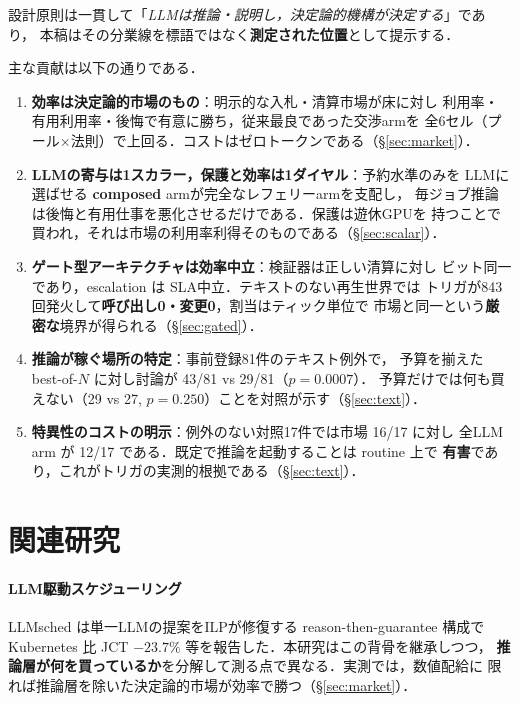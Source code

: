 \documentclass[uplatex,twocolumn,fontsize=9pt,paper=a4]{jlreq}
\begin{document}
設計原則は一貫して「\textit{LLMは推論・説明し，決定論的機構が決定する}」であり，
本稿はその分業線を標語ではなく\textbf{測定された位置}として提示する．

主な貢献は以下の通りである．
\begin{enumerate}
  \item \textbf{効率は決定論的市場のもの}：明示的な入札・清算市場が床に対し
        利用率・有用利用率・後悔で有意に勝ち，従来最良であった交渉armを
        全6セル（プール$\times$法則）で上回る．コストはゼロトークンである（\S\ref{sec:market}）．
  \item \textbf{LLMの寄与は1スカラー，保護と効率は1ダイヤル}：予約水準のみを
        LLMに選ばせる \textbf{composed} armが完全なレフェリーarmを支配し，
        毎ジョブ推論は後悔と有用仕事を悪化させるだけである．保護は遊休GPUを
        持つことで買われ，それは市場の利用率利得そのものである（\S\ref{sec:scalar}）．
  \item \textbf{ゲート型アーキテクチャは効率中立}：検証器は正しい清算に対し
        ビット同一であり，escalation は SLA中立．テキストのない再生世界では
        トリガが843回発火して\textbf{呼び出し0・変更0}，割当はティック単位で
        市場と同一という\textbf{厳密な}境界が得られる（\S\ref{sec:gated}）．
  \item \textbf{推論が稼ぐ場所の特定}：事前登録81件のテキスト例外で，
        予算を揃えた best-of-$N$ に対し討論が 43/81 vs 29/81（$p=0.0007$）．
        予算だけでは何も買えない（29 vs 27, $p=0.250$）ことを対照が示す（\S\ref{sec:text}）．
  \item \textbf{特異性のコストの明示}：例外のない対照17件では市場 16/17 に対し
        全LLM arm が 12/17 である．既定で推論を起動することは routine 上で
        \textbf{有害}であり，これがトリガの実測的根拠である（\S\ref{sec:text}）．
\end{enumerate}

\section{関連研究}
\paragraph{LLM駆動スケジューリング}
LLMsched \cite{llmsched} は単一LLMの提案をILPが修復する reason-then-guarantee 構成で
Kubernetes 比 JCT $-23.7\%$ 等を報告した．本研究はこの背骨を継承しつつ，
\textbf{推論層が何を買っているか}を分解して測る点で異なる．実測では，数値配給に
限れば推論層を除いた決定論的市場が効率で勝つ（\S\ref{sec:market}）．
\end{document}

